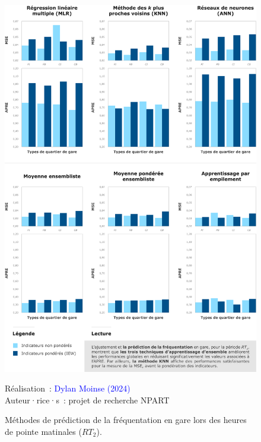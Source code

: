 \begin{refsegment}
    \begin{figure}[h!]\vspace*{4pt}
        \caption{Méthodes de prédiction de la fréquentation en gare lors des heures de pointe matinales (\(RT_{2}\)).}
        \label{fig-chap6:prediction-frequentation}
        \centerline{\includegraphics[width=1\columnwidth]{src/Figures/Chap-6/FR_NPART_Prediction_frequentation.pdf}}
        \vspace{5pt}
        \begin{flushright}\scriptsize{
        Réalisation~: \textcolor{blue}{Dylan Moinse (2024)}
        \\
        Auteur·rice·s~: projet de recherche \acrshort{NPART}
        }\end{flushright}
    \end{figure}


\end{refsegment}
